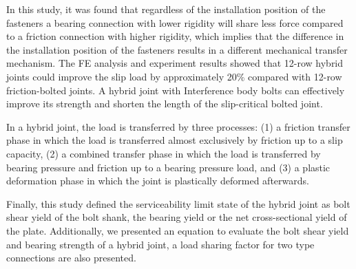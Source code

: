 
In this study, it was found that regardless of the installation position of the fasteners a bearing connection with lower rigidity will share less force compared to a friction connection with higher rigidity, which implies that the difference in the installation position of the fasteners results in a different mechanical transfer mechanism. The FE analysis and experiment results showed that 12-row hybrid joints could improve the slip load by approximately 20\% compared with 12-row friction-bolted joints. A hybrid joint with Interference body bolts can effectively improve its strength and shorten the length of the slip-critical bolted joint.

In a hybrid joint, the load is transferred by three processes: (1) a friction transfer phase in which the load is transferred almost exclusively by friction up to a slip capacity, (2) a combined transfer phase in which the load is transferred by bearing pressure and friction up to a bearing pressure load, and (3) a plastic deformation phase in which the joint is plastically deformed afterwards. 

Finally, this study defined the serviceability limit state of the hybrid joint as bolt shear yield of the bolt shank, the bearing yield or the net cross-sectional yield of the plate. Additionally, we presented an equation to evaluate the bolt shear yield and bearing strength of a hybrid joint, a load sharing factor for two type connections are also presented.

